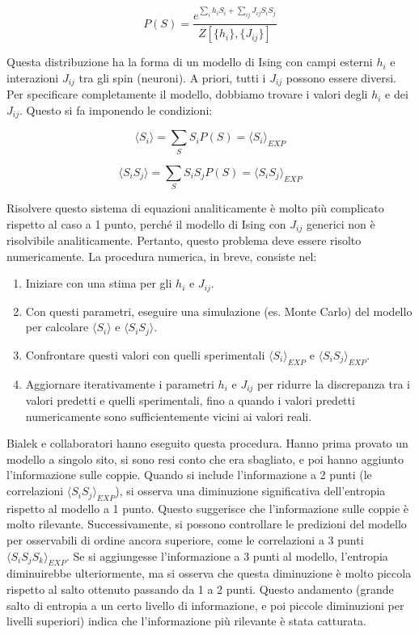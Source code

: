 \begin{equation} \label{eq:ch23_12}
P(S) = \frac{e^{\sum_i h_i S_i + \sum_{ij} J_{ij} S_i S_j}}{Z[\{h_i\}, \{J_{ij}\}]}
\end{equation}

Questa distribuzione ha la forma di un modello di Ising con campi esterni $h_i$ e interazioni $J_{ij}$ tra gli spin (neuroni). A priori, tutti i $J_{ij}$ possono essere diversi.
Per specificare completamente il modello, dobbiamo trovare i valori degli $h_i$ e dei $J_{ij}$. Questo si fa imponendo le condizioni:

\begin{equation} \label{eq:ch23_13}
\langle S_i \rangle = \sum_S S_i P(S) = \langle S_i \rangle_{EXP}
\end{equation}

\begin{equation} \label{eq:ch23_14}
\langle S_i S_j \rangle = \sum_S S_i S_j P(S) = \langle S_i S_j \rangle_{EXP}
\end{equation}

Risolvere questo sistema di equazioni analiticamente è molto più complicato rispetto al caso a 1 punto, perché il modello di Ising con $J_{ij}$ generici non è risolvibile analiticamente. Pertanto, questo problema deve essere risolto numericamente.
La procedura numerica, in breve, consiste nel:

\begin{enumerate}
    \item Iniziare con una stima per gli $h_i$ e $J_{ij}$.
    \item Con questi parametri, eseguire una simulazione (es. Monte Carlo) del modello per calcolare $\langle S_i \rangle$ e $\langle S_i S_j \rangle$.
    \item Confrontare questi valori con quelli sperimentali $\langle S_i \rangle_{EXP}$ e $\langle S_i S_j \rangle_{EXP}$.
    \item Aggiornare iterativamente i parametri $h_i$ e $J_{ij}$ per ridurre la discrepanza tra i valori predetti e quelli sperimentali, fino a quando i valori predetti numericamente sono sufficientemente vicini ai valori reali.
\end{enumerate}

Bialek e collaboratori hanno eseguito questa procedura. Hanno prima provato un modello a singolo sito, si sono resi conto che era sbagliato, e poi hanno aggiunto l'informazione sulle coppie.
Quando si include l'informazione a 2 punti (le correlazioni $\langle S_i S_j \rangle_{EXP}$), si osserva una diminuzione significativa dell'entropia rispetto al modello a 1 punto. Questo suggerisce che l'informazione sulle coppie è molto rilevante.
Successivamente, si possono controllare le predizioni del modello per osservabili di ordine ancora superiore, come le correlazioni a 3 punti $\langle S_i S_j S_k \rangle_{EXP}$.
Se si aggiungesse l'informazione a 3 punti al modello, l'entropia diminuirebbe ulteriormente, ma si osserva che questa diminuzione è molto piccola rispetto al salto ottenuto passando da 1 a 2 punti. Questo andamento (grande salto di entropia a un certo livello di informazione, e poi piccole diminuzioni per livelli superiori) indica che l'informazione più rilevante è stata catturata.

